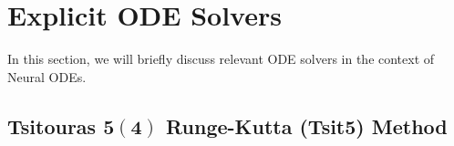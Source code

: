 \section{Explicit ODE Solvers}
\label{subsec:explicit_ode_solvers}

In this section, we will briefly discuss relevant ODE solvers in the context of Neural ODEs. %



\subsection{Tsitouras $\mathbf{5 (4)}$ Runge-Kutta (Tsit5) Method}
\label{subsec:tsit5_method}

